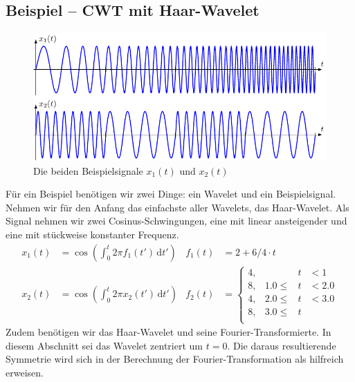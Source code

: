 \subsection{Beispiel -- CWT mit Haar-Wavelet}
\begin{figure}
	\centering
	\includegraphics[width=\textwidth, keepaspectratio]{papers/complex/images/signals.pdf}
	\caption{Die beiden Beispielsignale $x_1(t)$ und $x_2(t)$}
\end{figure}
Für ein Beispiel benötigen wir zwei Dinge: ein Wavelet und ein Beispielsignal.
Nehmen wir für den Anfang das einfachste aller Wavelets, das Haar-Wavelet.
Als Signal nehmen wir zwei Cosinus-Schwingungen, eine mit linear ansteigender und eine mit stückweise konstanter Frequenz.
\begin{align}
    x_1(t) &= \cos\left( \int_{0}^{t} 2\pi f_1(t')\,\mathrm{d}t'\right) & f_1(t) &= 2 + 6/4 \cdot t \\
    x_2(t) &= \cos\left( \int_{0}^{t} 2\pi x_2(t')\,\mathrm{d}t'\right) & f_2(t) &= \left\lbrace \begin{matrix}
    4, & &t& < 1\\
    8, & 1.0 \le &t& < 2.0\\
    4, & 2.0 \le &t& < 3.0\\
    8, & 3.0 \le &t&\\
    \end{matrix}\right.
\end{align}
Zudem benötigen wir das Haar-Wavelet und seine Fourier-Transformierte.
In diesem Abschnitt sei das Wavelet zentriert um $t=0$.
Die daraus resultierende Symmetrie wird sich in der Berechnung der Fourier-Transformation als hilfreich erweisen.

